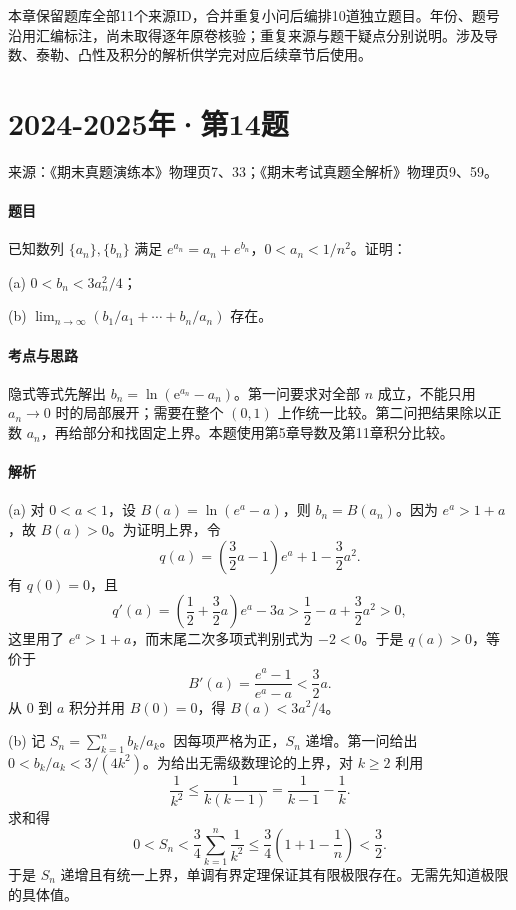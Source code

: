 \documentclass[UTF8,fontset=fandol,12pt,oneside,openany]{ctexrep}
\newcommand{\ee}{\mathrm e}
\theoremstyle{definition}
\begin{document}
本章保留题库全部11个来源ID，合并重复小问后编排10道独立题目。年份、题号沿用汇编标注，尚未取得逐年原卷核验；重复来源与题干疑点分别说明。涉及导数、泰勒、凸性及积分的解析供学完对应后续章节后使用。

\par\addvspace{18pt}\noindent\begin{minipage}{\linewidth}
\section{2024-2025年·第14题}
\noindent 来源：《期末真题演练本》物理页7、33；《期末考试真题全解析》物理页9、59。

\paragraph{题目}
已知数列 $\{a_n\},\{b_n\}$ 满足 $e^{a_n}=a_n+e^{b_n}$，$0<a_n<1/n^2$。证明：

(a) $0<b_n<3a_n^2/4$；

(b) $\lim_{n\to\infty}(b_1/a_1+\cdots+b_n/a_n)$ 存在。
\end{minipage}\par
\paragraph{考点与思路}
隐式等式先解出 $b_n=\ln(\ee^{a_n}-a_n)$。第一问要求对全部 $n$ 成立，不能只用 $a_n\to0$ 时的局部展开；需要在整个 $(0,1)$ 上作统一比较。第二问把结果除以正数 $a_n$，再给部分和找固定上界。本题使用第5章导数及第11章积分比较。

\paragraph{解析}
(a) 对 $0<a<1$，设 $B(a)=\ln(e^a-a)$，则 $b_n=B(a_n)$。因为 $e^a>1+a$，故 $B(a)>0$。为证明上界，令 \[
q(a)=\left(\frac32a-1\right)e^a+1-\frac32a^2.
\]有 $q(0)=0$，且 \[
q'(a)=\left(\frac12+\frac32a\right)e^a-3a>\frac12-a+\frac32a^2>0,
\]这里用了 $e^a>1+a$，而末尾二次多项式判别式为 $-2<0$。于是 $q(a)>0$，等价于 \[
B'(a)=\frac{e^a-1}{e^a-a}<\frac32a.
\]从 $0$ 到 $a$ 积分并用 $B(0)=0$，得 $B(a)<3a^2/4$。

(b) 记 $S_n=\sum_{k=1}^n b_k/a_k$。因每项严格为正，$S_n$ 递增。第一问给出 $0<b_k/a_k<3/(4k^2)$。为给出无需级数理论的上界，对 $k\ge2$ 利用
\[
\frac1{k^2}\le\frac1{k(k-1)}=\frac1{k-1}-\frac1k.
\]
求和得
\[
0<S_n<\frac34\sum_{k=1}^n\frac1{k^2}
\le\frac34\left(1+1-\frac1n\right)<\frac32.
\]
于是 $S_n$ 递增且有统一上界，单调有界定理保证其有限极限存在。无需先知道极限的具体值。
\end{document}
